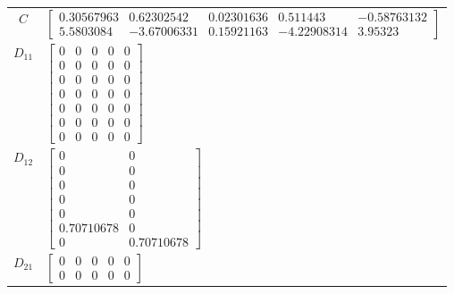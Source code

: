 \begin{tabular}{cl}
   $C$    & $\left[\begin{matrix}0.30567963 & 0.62302542 & 0.02301636 & 0.511443 & -0.58763132\\5.5803084 & -3.67006331 & 0.15921163 & -4.22908314 & 3.95323\end{matrix}\right]$                                                                                                                                                                                                                                 \\
 $D_{11}$ & $\left[\begin{matrix}0 & 0 & 0 & 0 & 0\\0 & 0 & 0 & 0 & 0\\0 & 0 & 0 & 0 & 0\\0 & 0 & 0 & 0 & 0\\0 & 0 & 0 & 0 & 0\\0 & 0 & 0 & 0 & 0\\0 & 0 & 0 & 0 & 0\end{matrix}\right]$                                                                                                                                                                                                                         \\
 $D_{12}$ & $\left[\begin{matrix}0 & 0\\0 & 0\\0 & 0\\0 & 0\\0 & 0\\0.70710678 & 0\\0 & 0.70710678\end{matrix}\right]$                                                                                                                                                                                                                                                                                           \\
 $D_{21}$ & $\left[\begin{matrix}0 & 0 & 0 & 0 & 0\\0 & 0 & 0 & 0 & 0\end{matrix}\right]$                                                                                                                                                                                                                                                                                                                        \\
\hline
\end{tabular}